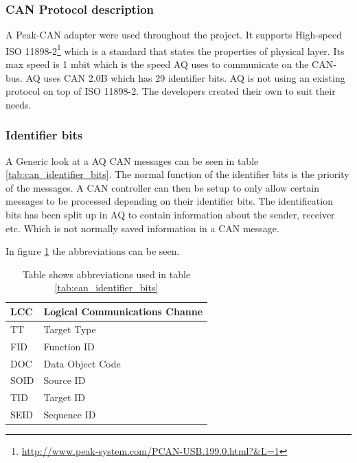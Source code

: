 \subsubsection{CAN Protocol description}
A Peak-CAN adapter were used throughout the project. It supports High-speed ISO 11898-2\footnote{\url{http://www.peak-system.com/PCAN-USB.199.0.html?&L=1}} which is a standard that states the properties of physical layer. 
Its max speed is 1 mbit which is the speed AQ uses to communicate on the CAN-bus. 
AQ uses CAN 2.0B which has 29 identifier bits.
AQ is not using an existing protocol on top of ISO 11898-2. The developers created their own to suit their needs.\\

\subsubsection*{Identifier bits}
A Generic look at a AQ CAN messages can be seen in table \ref{tab:can_identifier_bits}.
The normal function of the identifier bits is the priority of the messages.
A CAN controller can then be setup to only allow certain messages to be processed depending on their identifier bits.
The identification bits has been split up in AQ to contain information about the sender, receiver etc. Which is not normally saved information in a CAN message.
\begin{table}[H]
	\caption{Table shows the identifier bits used in AutoQuad CAN messages}
	\label{tab:can_identifier_bits}
\end{table}

In figure \ref{tab:abbri_can_msg} the abbreviations can be seen.
\begin{table}[H]
		\begin{tabular}{|l|l|}
		\hline
		LCC & Logical Communications Channe \\
\hline
		TT & Target Type \\
\hline
		FID & Function ID \\
\hline
		DOC & Data Object Code \\
\hline
		SOID & Source ID \\
\hline
		TID & Target ID \\
\hline
		SEID & Sequence ID \\
\hline
		\end{tabular}
		\caption{Table shows 
abbreviations used in table \ref{tab:can_identifier_bits}}
		\label{tab:abbri_can_msg}
\end{table}

